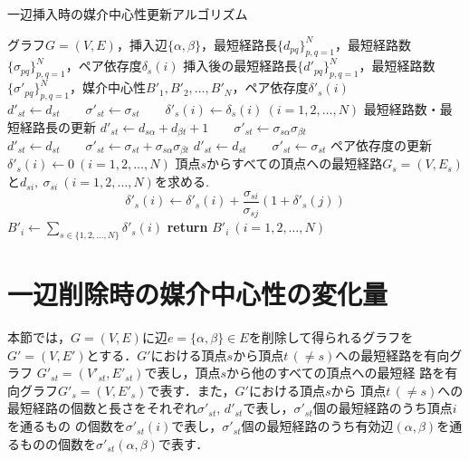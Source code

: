 \begin{algorithm}[H]
  \caption{一辺挿入時の媒介中心性更新アルゴリズム}
  \label{algo:update-bc-on-insert}
  \begin{algorithmic}[1]
    \Require グラフ$G=(V,E)$，挿入辺$\{\alpha,\beta\}$，最短経路長$\{d_{pq}\}_{p,q=1}^N$，最短経路数$\{\sigma_{pq}\}_{p,q=1}^N$，ペア依存度$\delta_s(i)$
    \Ensure 挿入後の最短経路長$\{d'_{pq}\}_{p,q=1}^N$，最短経路数$\{\sigma'_{pq}\}_{p,q=1}^N$，媒介中心性$B'_1,B'_2,\ldots,B'_N$，ペア依存度$\delta'_s(i)$
    \State $d'_{st}\gets d_{st}\qquad\sigma'_{st}\gets\sigma_{st}\qquad\delta'_s(i)\gets\delta_s(i)\ (i=1,2,\ldots,N)$
    \Else
    \State\Comment 最短経路数・最短経路長の更新
    \State $d'_{st}\gets d_{s\alpha}+d_{\beta t}+1\qquad\sigma'_{st}\gets \sigma_{s\alpha}\sigma_{\beta t}$
    \State $d'_{st}\gets d_{st}\qquad\sigma'_{st}\gets \sigma_{st}+\sigma_{s\alpha}\sigma_{\beta t}$
    \State $d'_{st}\gets d_{st}\qquad\sigma'_{st}\gets\sigma_{st}$
    \EndIf
    \State\Comment ペア依存度の更新
    \State $\delta'_s(i)\gets0\ (i=1,2,\ldots,N)$
    \State 頂点$s$からすべての頂点への最短経路$G_s=(V,E_s)$と$d_{si},\ \sigma_{si}\ (i=1,2,\ldots,N)$を求める. 
    \State \begin{equation*} \delta'_s(i)\gets\delta'_s(i)+\frac{\sigma_{si}}{\sigma_{sj}}(1+\delta'_s(j)) \end{equation*}
    \EndFor
    \EndIf
    \EndFor
    \State $B'_i\gets\sum_{s\in\{1,2,\ldots,N\}}\delta'_s(i)$
    \State \textbf{return} $B'_i\ (i=1,2,\ldots,N)$
  \end{algorithmic}
\end{algorithm}

\section{一辺削除時の媒介中心性の変化量}
\label{sect:update-bc-on-delete}
本節では，$G=(V,E)$に辺$e=\{\alpha,\beta\}\in E$を削除して得られるグラフを
$G'=(V,E')$とする．$G'$における頂点$s$から頂点$t\,(\neq s)$への最短経路を有向グラフ
$G'_{st}=(V'_{st},E'_{st})$で表し，頂点$s$から他のすべての頂点への最短経
路を有向グラフ$G'_s=(V,E'_s)$で表す．また，$G'$における頂点$s$から
頂点$t\,(\neq s)$への最短経路の個数と長さをそれぞれ$\sigma'_{st}$, 
$d'_{st}$で表し，$\sigma'_{st}$個の最短経路のうち頂点$i$を通るもの
の個数を$\sigma'_{st}(i)$で表し，$\sigma'_{st}$個の最短経路のうち有効辺$(\alpha,\beta)$を通るものの個数を$\sigma'_{st}(\alpha,\beta)$で表す．

